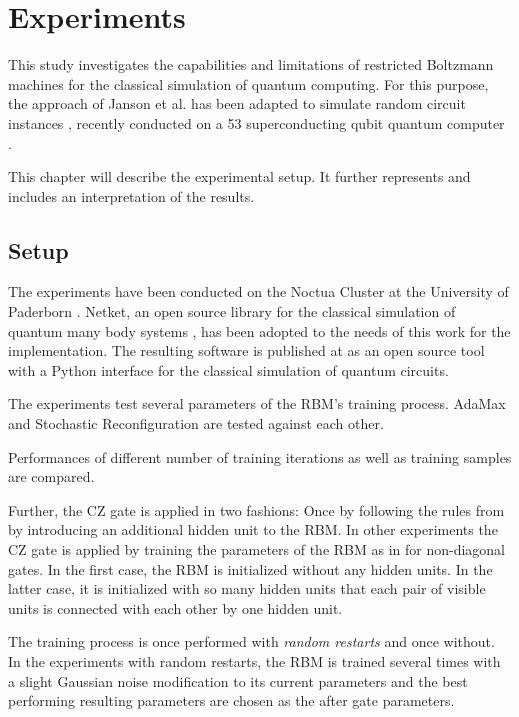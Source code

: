 \chapter{Experiments}

This study investigates the capabilities and limitations of restricted Boltzmann machines
for the classical simulation of quantum computing. For this purpose, the approach of Janson 
et al. \cite{jnsson2018neuralnetwork} has been adapted to simulate random circuit instances \cite{Boixo2018supremacy},
recently conducted on a 53 superconducting qubit quantum computer \cite{martines2019supremacy}.

This chapter will describe the experimental setup. It further represents and includes an
interpretation of the results.

\section{Setup}

The experiments have been conducted on the Noctua Cluster at the University of Paderborn \cite{}.
Netket, an open source library for the classical simulation of quantum 
many body systems \cite{}, has been adopted to the needs of this work for the implementation. The resulting 
software is published at \cite{} as an open source tool with a Python interface for the classical simulation 
of quantum circuits.

The experiments test several parameters of the RBM's training process. AdaMax and 
Stochastic Reconfiguration are tested against each other. 

Performances of different number of training iterations 
as well as training samples are compared. 

Further, the CZ gate is applied in two fashions: Once 
by following the rules from \cite{} by introducing an additional hidden unit to the RBM. In other 
experiments the CZ gate is applied by training the parameters of the RBM as in \cite{} for 
non-diagonal gates. In the first case, the RBM is initialized without any hidden units. In the latter 
case, it is initialized with so many hidden units that each pair of visible units is connected with each other 
by one hidden unit. 

The training process is once performed with \textit{random restarts} and once without. 
In the experiments with random restarts, the RBM is trained several times with a slight Gaussian noise modification to its 
current parameters and the best performing resulting parameters are chosen as the after gate parameters. 

